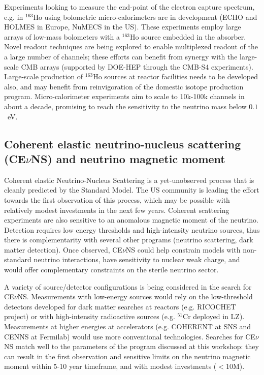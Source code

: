 Experiments looking to measure the end-point of the electron capture
spectrum, e.g. in $^{163}$Ho using bolometric micro-calorimeters are
in development (ECHO and HOLMES in Europe, NuMECS in the US). These
experiments employ large arrays of low-mass bolometers with a
$^{163}$Ho source embedded in the absorber. Novel readout techniques
are being explored to enable multiplexed readout of the a large number
of channels; these efforts can benefit from synergy with the
large-scale CMB arrays (supported by DOE-HEP through the CMB-S4
experiments). Large-scale production of $^{163}$Ho sources at reactor
facilities needs to be developed also, and may benefit from
reinvigoration of the domestic isotope production program. 
Micro-calorimeter experiments aim to scale to 10k-100k
channels in about a decade, promising to reach the sensitivity to the
neutrino mass below $0.1$~eV.


\subsection{Coherent elastic neutrino-nucleus scattering (CE$\nu$NS)
  and neutrino magnetic moment}

Coherent elastic Neutrino-Nucleus Scattering is a yet-unobserved
process that is cleanly predicted by the Standard Model.  The US
community is leading the effort towards the first observation of this
process, which may be possible with relatively modest investments in
the next few years. Coherent scattering experiments are also
sensitive to an anomalous magnetic moment of the neutrino. Detection
requires low energy thresholds and high-intensity neutrino sources,
thus there is complementarity with several other programs (neutrino
scattering, dark matter detection). Once observed, CE$\nu$NS could help
constrain models with non-standard neutrino interactions, have
sensitivity to nuclear weak charge, and would offer complementary
constraints on the sterile neutrino sector. 

A variety of source/detector configurations is being considered in the
search for CE$\nu$NS. Measurements with low-energy sources would rely
on the low-threshold detectors developed for dark matter searches at
reactors (e.g. RICOCHET project) or with high-intensity radioactive
sources (e.g. $^{51}$Cr deployed in LZ). Measurements at higher
energies at accelerators (e.g. COHERENT at SNS and CENNS at Fermilab)
would use more conventional technologies. Searches for CE$\nu$NS match
well to the parameters of the program discussed at this workshop: they
can result in the first observation and sensitive limits on the
neutrino magnetic moment within 5-10 year timeframe, and with modest
investments ($<10$M). 

